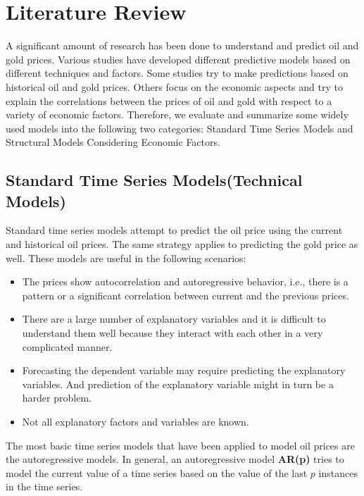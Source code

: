 \documentclass[runningheads]{llncs}
\begin{document}
\newpage

\section{Literature Review}
A significant amount of research has been done to understand and predict oil and gold prices. Various studies have developed different predictive models based on different techniques and factors. Some studies try to make predictions based on historical oil and gold prices. Others focus on the economic aspects and try to explain the correlations between the prices of oil and gold with respect to a variety of economic factors. Therefore, we evaluate and summarize some widely used models into the following two categories: Standard Time Series Models and Structural Models Considering Economic Factors.

\subsection{Standard Time Series Models(Technical Models)}
Standard time series models attempt to predict the oil price using the current and historical oil prices. The same strategy applies to predicting the gold price as well. These models are useful in the following scenarios:
\begin {itemize}
\item The prices show autocorrelation and autoregressive behavior, i.e., there is a pattern or a significant correlation between current and the previous prices.\\
\item There are a large number of explanatory variables and it is difficult to understand them well because they interact with each other in a very complicated manner. \\
\item Forecasting the dependent variable may require predicting the explanatory variables. And prediction of the explanatory variable might in turn be a harder problem.\\
\item Not all explanatory factors and variables are known.\\ 
\end {itemize}


\noindent The most basic time series models that have been applied to model oil prices are the autoregressive models. In general, an autoregressive model \textbf{AR(p)} tries to model the current value of a time series based on the value of the last $p$ instances in the time series.\\
\end{document}
